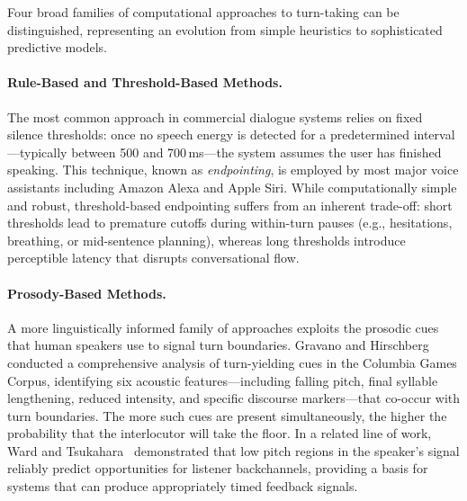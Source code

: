 Four broad families of computational approaches to turn-taking can be distinguished, representing an evolution from simple heuristics to sophisticated predictive models.

\paragraph{Rule-Based and Threshold-Based Methods.}
The most common approach in commercial dialogue systems relies on fixed silence thresholds: once no speech energy is detected for a predetermined interval---typically between 500 and 700\,ms---the system assumes the user has finished speaking. This technique, known as \emph{endpointing}, is employed by most major voice assistants including Amazon Alexa and Apple Siri. While computationally simple and robust, threshold-based endpointing suffers from an inherent trade-off: short thresholds lead to premature cutoffs during within-turn pauses (e.g., hesitations, breathing, or mid-sentence planning), whereas long thresholds introduce perceptible latency that disrupts conversational flow.

\paragraph{Prosody-Based Methods.}
A more linguistically informed family of approaches exploits the prosodic cues that human speakers use to signal turn boundaries. Gravano and Hirschberg~\cite{gravano2011turncues} conducted a comprehensive analysis of turn-yielding cues in the Columbia Games Corpus, identifying six acoustic features---including falling pitch, final syllable lengthening, reduced intensity, and specific discourse markers---that co-occur with turn boundaries. The more such cues are present simultaneously, the higher the probability that the interlocutor will take the floor. In a related line of work, Ward and Tsukahara~\cite{ward2000backchannel} demonstrated that low pitch regions in the speaker's signal reliably predict opportunities for listener backchannels, providing a basis for systems that can produce appropriately timed feedback signals.

